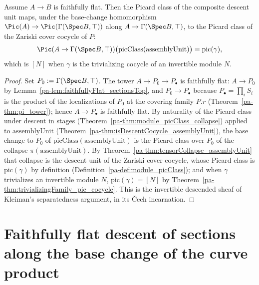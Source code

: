 \begin{theorem}
  \label{pa-thm:mapAlgebra_picClass_assemblyUnit}
  \leanok

  Assume \(A \to B\) is faithfully flat. Then the Picard class of the composite descent unit
  maps, under the base-change homomorphism \(\Pic(A) \to \Pic(\Gamma(\Spec B, \top))\) along
  \(A \to \Gamma(\Spec B, \top)\), to the Picard class of the Zariski cover cocycle of \(P\):
  \[
    \Pic(A \to \Gamma(\Spec B, \top))\bigl(\mathrm{picClass}(\mathrm{assemblyUnit})\bigr)
      = \mathrm{pic}(\gamma) ,
  \]
  which is \([N]\) when \(\gamma\) is the trivializing cocycle of an invertible module \(N\).
\end{theorem}
\begin{proof}
  \leanok
  Set \(P_0 := \Gamma(\Spec B, \top)\). The tower \(A \to P_0 \to P_{\!\bullet}\) is faithfully
  flat: \(A \to P_0\) by Lemma~\ref{pa-lem:faithfullyFlat_sectionsTop}, and \(P_0 \to
  P_{\!\bullet}\) because \(P_{\!\bullet} = \prod_i S_i\) is the product of the localizations of
  \(P_0\) at the covering family \(P.r\) (Theorem~\ref{pa-thm:pi_tower}); hence \(A \to
  P_{\!\bullet}\) is faithfully flat. By naturality of the Picard class under descent in stages
  (Theorem~\ref{pa-thm:module_picClass_collapse}) applied to \(\mathrm{assemblyUnit}\)
  (Theorem~\ref{pa-thm:isDescentCocycle_assemblyUnit}), the base change to \(P_0\) of
  \(\mathrm{picClass}(\mathrm{assemblyUnit})\) is the Picard class over \(P_0\) of the collapse
  \(\pi(\mathrm{assemblyUnit})\). By Theorem~\ref{pa-thm:tensorCollapse_assemblyUnit} that collapse
  is the descent unit of the Zariski cover cocycle, whose Picard class is \(\mathrm{pic}(\gamma)\)
  by definition (Definition~\ref{pa-def:module_picClass}); and when \(\gamma\) trivializes an
  invertible module \(N\), \(\mathrm{pic}(\gamma) = [N]\) by
  Theorem~\ref{pa-thm:trivializingFamily_pic_cocycle}. This is the invertible descended sheaf of
  Kleiman's separatedness argument, in its \v Cech incarnation.
\end{proof}

\section{Faithfully flat descent of sections along the base change of the curve product}
\label{pa-sec:sectionsDescent}

